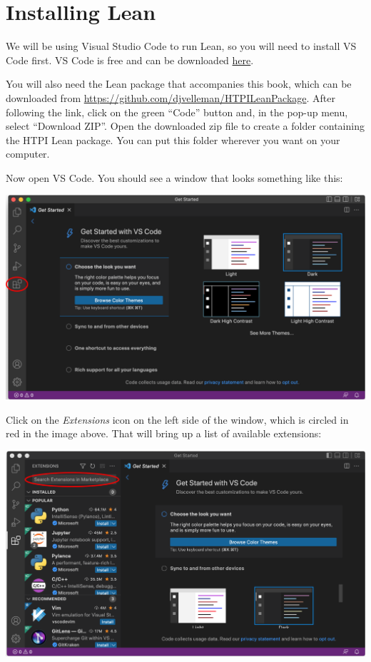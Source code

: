 \documentclass[
  letterpaper,
  DIV=11,
  numbers=noendperiod]{scrreprt}
\theoremstyle{remark}
\begin{document}
\hypertarget{installing-lean}{%
\section*{Installing Lean}\label{installing-lean}}

We will be using Visual Studio Code to run Lean, so you will need to
install VS Code first. VS Code is free and can be downloaded
\href{https://code.visualstudio.com}{here}.

You will also need the Lean package that accompanies this book, which
can be downloaded from
\url{https://github.com/djvelleman/HTPILeanPackage}. After following the
link, click on the green ``Code'' button and, in the pop-up menu, select
``Download ZIP''. Open the downloaded zip file to create a folder
containing the HTPI Lean package. You can put this folder wherever you
want on your computer.

Now open VS Code. You should see a window that looks something like
this:

\includegraphics{./Images/VSCodeStart.png}

Click on the \emph{Extensions} icon on the left side of the window,
which is circled in red in the image above. That will bring up a list of
available extensions:

\includegraphics{./Images/FindExtension.png}
\end{document}
